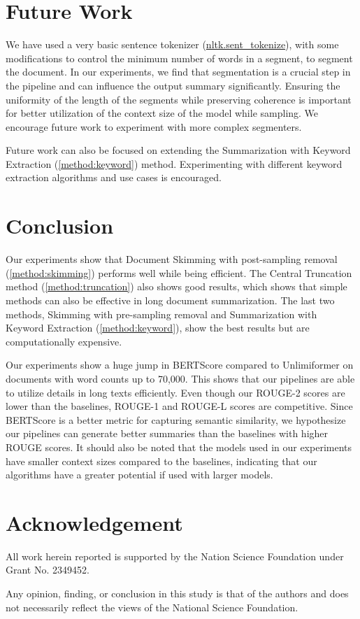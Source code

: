 \section{Future Work}
	\label{sec:future-work}

	We have used a very basic sentence tokenizer
	(\href{https://www.nltk.org/api/nltk.tokenize.sent_tokenize.html}{nltk.sent\_tokenize}),
	with some modifications to control the minimum number of words in a segment,
	to segment the document.
	In our experiments, we find that segmentation is a crucial step in the pipeline and can
	influence the output summary significantly.
	Ensuring the uniformity of the length of the segments while preserving coherence is
	important for better utilization of the context size of the model while sampling.
	We encourage future work to experiment with more complex segmenters.

	Future work can also be focused on extending the Summarization with Keyword Extraction
	(\ref{method:keyword}) method.
	Experimenting with different keyword extraction algorithms and use cases is encouraged.


\section{Conclusion}
\label{sec:conclusion}

	Our experiments show that Document Skimming with post-sampling removal
	(\ref{method:skimming}) performs well while being efficient.
	The Central Truncation method (\ref{method:truncation}) also shows good results,
	which shows that simple methods can also be effective in long document summarization.
	The last two methods, Skimming with pre-sampling removal and Summarization with Keyword
	Extraction (\ref{method:keyword}), show the best results but are computationally expensive.

	Our experiments show a huge jump in BERTScore compared to Unlimiformer on documents
	with word counts up to 70,000.
	This shows that our pipelines are able to utilize details in long texts efficiently.
	Even though our ROUGE-2 scores are lower than the baselines, ROUGE-1 and ROUGE-L
	scores are competitive.
	Since BERTScore is a better metric for capturing semantic similarity, we hypothesize
	our pipelines can generate better summaries than the baselines with higher ROUGE scores.
	It should also be noted that the models used in our experiments have smaller context sizes
	compared to the baselines, indicating that our algorithms have a greater potential if
	used with larger models.


\section*{Acknowledgement}

	All work herein reported is supported by the Nation Science Foundation under Grant
	No. 2349452.

	Any opinion, finding, or conclusion in this study is that of the authors and does not
	necessarily reflect the views of the National Science Foundation.
